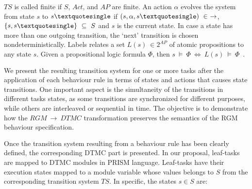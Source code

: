$TS$ is called finite if $S$, $Act$, and $AP$ are finite. An action $\alpha$ evolves the system from state $s$ to $s\squote$ if $(s, \alpha, s\squote)\ \in\ \rightarrow$, $\{s, s\squote\}\ \subseteq\ S$ and $s$ is the current state. In case a state has more than one outgoing transition, the `next' transition is chosen nondeterministically. Labels relates a set $L(s)\ \in 2^{AP}$ of atomic propositions to any state $s$. Given a propositional logic formula $\Phi$, then $s\ \models\ \Phi\ \iff\ L(s)\ \models\ \Phi$~\cite{Baier:2008}.

We present the resulting transition system for one or more tasks after the application of each behaviour rule in terms of states and actions that causes state transitions. One important aspect is the simultaneity of the transitions in different tasks states, as some transitions are synchronized for different purposes, while others are interleaved or sequential in time. The objective is to demonstrate how the $RGM\ \rightarrow\ DTMC$ transformation preserves the semantics of the RGM behaviour specification.

Once the transition system resulting from a behaviour rule has been clearly defined, the corresponding DTMC part is presented. In our proposal, leaf-tasks are mapped to DTMC modules in PRISM language. Leaf-tasks have their execution states mapped to a module variable whose values belongs to $S$ from the corresponding transition system $TS$. In specific, the states $s \in S$ are:

%
%

